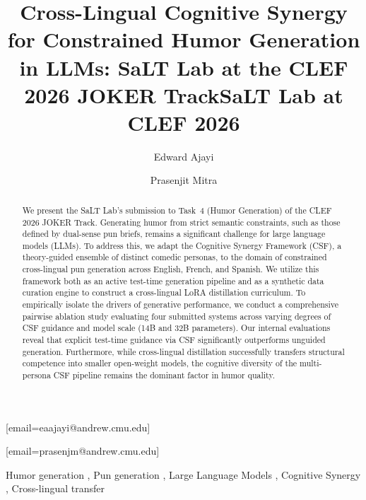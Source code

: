 \documentclass[]{ceurart}
\begin{document}



\title{Cross-Lingual Cognitive Synergy for Constrained Humor Generation in LLMs: SaLT Lab at the CLEF 2026 JOKER Track}

\title[mode=sub]{SaLT Lab at CLEF 2026}

\author[1]{Edward Ajayi}[email=eaajayi@andrew.cmu.edu]
\author[1]{Prasenjit Mitra}[email=prasenjm@andrew.cmu.edu]
\cormark[1]
\address[1]{Carnegie Mellon University Africa, Kigali, Rwanda}

\begin{abstract}
We present the SaLT Lab's submission to Task~4 (Humor Generation) of the CLEF 2026 JOKER Track. Generating humor from strict semantic constraints, such as those defined by dual-sense pun briefs, remains a significant challenge for large language models (LLMs). To address this, we adapt the Cognitive Synergy Framework (CSF), a theory-guided ensemble of distinct comedic personas, to the domain of constrained cross-lingual pun generation across English, French, and Spanish. We utilize this framework both as an active test-time generation pipeline and as a synthetic data curation engine to construct a cross-lingual LoRA distillation curriculum. To empirically isolate the drivers of generative performance, we conduct a comprehensive pairwise ablation study evaluating four submitted systems across varying degrees of CSF guidance and model scale (14B and 32B parameters). Our internal evaluations reveal that explicit test-time guidance via CSF significantly outperforms unguided generation. Furthermore, while cross-lingual distillation successfully transfers structural competence into smaller open-weight models, the cognitive diversity of the multi-persona CSF pipeline remains the dominant factor in humor quality.
\end{abstract}

\begin{keywords}
  Humor generation \sep
  Pun generation \sep
  Large Language Models \sep
  Cognitive Synergy \sep
  Cross-lingual transfer
\end{keywords}
\end{document}
